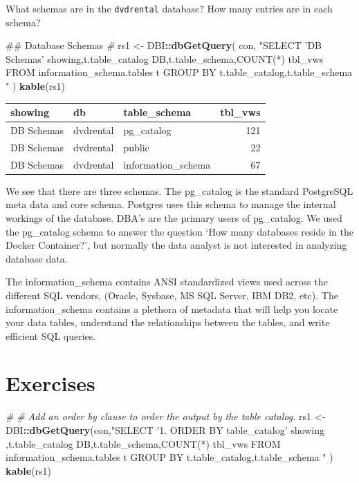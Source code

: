 \documentclass[]{book}
\newenvironment{Shaded}{\begin{snugshade}}{\end{snugshade}}
\newcommand{\CommentTok}[1]{\textcolor[rgb]{0.56,0.35,0.01}{\textit{#1}}}
\newcommand{\KeywordTok}[1]{\textcolor[rgb]{0.13,0.29,0.53}{\textbf{#1}}}
\newcommand{\NormalTok}[1]{#1}
\newcommand{\OperatorTok}[1]{\textcolor[rgb]{0.81,0.36,0.00}{\textbf{#1}}}
\newcommand{\StringTok}[1]{\textcolor[rgb]{0.31,0.60,0.02}{#1}}
\theoremstyle{definition}
\theoremstyle{definition}
\theoremstyle{definition}
\theoremstyle{remark}
\begin{document}
What schemas are in the \texttt{dvdrental} database? How many entries
are in each schema?

\begin{Shaded}
\begin{Highlighting}[]
\NormalTok{## Database Schemas}
\CommentTok{#  }
\NormalTok{rs1 <-}
\StringTok{  }\NormalTok{DBI}\OperatorTok{::}\KeywordTok{dbGetQuery}\NormalTok{(}
\NormalTok{  con,}
  \StringTok{"SELECT 'DB Schemas' showing,t.table_catalog DB,t.table_schema,COUNT(*) tbl_vws}
\StringTok{     FROM information_schema.tables t}
\StringTok{    GROUP BY t.table_catalog,t.table_schema}
\StringTok{  "}
\NormalTok{  )}
\KeywordTok{kable}\NormalTok{(rs1)}
\end{Highlighting}
\end{Shaded}

\begin{tabular}{l|l|l|r}
\hline
showing & db & table\_schema & tbl\_vws\\
\hline
DB Schemas & dvdrental & pg\_catalog & 121\\
\hline
DB Schemas & dvdrental & public & 22\\
\hline
DB Schemas & dvdrental & information\_schema & 67\\
\hline
\end{tabular}

We see that there are three schemas. The pg\_catalog is the standard
PostgreSQL meta data and core schema. Postgres uses this schema to
manage the internal workings of the database. DBA's are the primary
users of pg\_catalog. We used the pg\_catalog schema to answer the
question `How many databases reside in the Docker Container?', but
normally the data analyst is not interested in analyzing database data.

The information\_schema contains ANSI standardized views used across the
different SQL vendors, (Oracle, Sysbase, MS SQL Server, IBM DB2, etc).
The information\_schema contains a plethora of metadata that will help
you locate your data tables, understand the relationships between the
tables, and write efficient SQL queries.

\hypertarget{exercises-1}{%
\section{Exercises}\label{exercises-1}}

\begin{Shaded}
\begin{Highlighting}[]
\CommentTok{#}
\CommentTok{# Add an order by clause to order the output by the table catalog.}
\NormalTok{rs1 <-}\StringTok{ }\NormalTok{DBI}\OperatorTok{::}\KeywordTok{dbGetQuery}\NormalTok{(con,}\StringTok{"SELECT '1. ORDER BY table_catalog' showing}
\StringTok{                                  ,t.table_catalog DB,t.table_schema,COUNT(*) tbl_vws }
\StringTok{                              FROM information_schema.tables t}
\StringTok{                            GROUP BY t.table_catalog,t.table_schema}
\StringTok{                            "}
\NormalTok{                      )}
\KeywordTok{kable}\NormalTok{(rs1)}
\end{Highlighting}
\end{Shaded}
\end{document}
